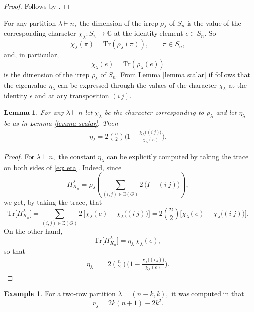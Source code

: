 \documentclass[12pt,dvipsnames,accepted=2016-08-18,a4paper,onecolumn]{quantumarticle}
\renewcommand{\qedsymbol}{\rule[.12ex]{1.2ex}{1.2ex}}
\numberwithin{equation}{section}
\newtheorem{lemma}[theorem]{Lemma}
\theoremstyle{definition}
\newtheorem{example}[theorem]{Example}
\begin{document}
\begin{proof}
	Follows by \cite[Lemma 2.11]{BCEHK24}.
\end{proof}

For any partition $\lambda \vdash n,$
the dimension of the irrep $\rho_\lambda$ of $S_n$ is the value of the corresponding character $\chi_\lambda : S_n \to \mathbb{C}$ at the identity element $e \in S_n.$ So
$$
\chi_\lambda (\pi) = \text{Tr}(\rho_\lambda(\pi)), \quad \quad \pi \in S_n,
$$
and, in particular,
$$
\chi_\lambda (e) = \text{Tr}(\rho_\lambda(e))
$$
is the dimension of the irrep $\rho_\lambda$ of $S_n.$ 
From Lemma \ref{lemma scalar} if follows that the eigenvalue $\eta_\lambda$ can be expressed through the values of the character $\chi_\lambda$ at the identity $e$ and at any transposition $(i\,j).$




\begin{lemma}\label{l:char}
For any $\lambda \vdash n$ let $\chi_\lambda$ be the character corresponding to $\rho_\lambda$ and let $\eta_\lambda$ be as in Lemma \ref{lemma scalar}. Then
    \begin{align}\label{eq:etafromchi}
\eta_\lambda = 2 \binom{n}{2} \bigg(1-\frac{\chi_\lambda\big((i\ j)\big)}{\chi_\lambda(e)}\bigg).	
\end{align}
\end{lemma}

\begin{proof}
For $\lambda \vdash n,$ the constant $\eta_\lambda$ can be explicitly computed by taking the trace on both sides of \eqref{eq: eta}. Indeed, since 
$$
H_{K_n}^{\lambda} =  \rho_\lambda \left(
\sum_{(i,j) \in \text{E}(G)} 
2\,\big(I - (i\ j)\big)\right),
$$
we get, by taking the trace, that
$$
\text{Tr} \big[ H_{K_n}^{\lambda}\big] = \sum_{(i,j) \in \text{E}(G)} 
2 \,\big[\chi_\lambda(e) - \chi_\lambda\big((i\ j)\big)\big] = 2\binom{n}{2}\big[\chi_\lambda(e) - \chi_\lambda\big((i\ j)\big)\big].
$$
On the other hand,
$$
\text{Tr} \big[ H_{K_n}^{\lambda}\big] = \eta_\lambda\, \chi_\lambda(e),
$$
so that
\begin{align*}
\eta_\lambda & = 2 \binom{n}{2} \bigg(1-\frac{\chi_\lambda\big((i\ j)\big)}{\chi_\lambda(e)}\bigg).\tag*{\qed}
\end{align*}
\renewcommand{\qedsymbol}{}
\end{proof}







\begin{example}\label{rem:eta2}
	For a two-row partition $\lambda = (n-k,k),$ it was computed in \cite[Lemma 2.12]{BCEHK24} that
	$$
	\eta_\lambda = 2k(n+1)-2k^2.
	$$
\end{example}
\end{document}
